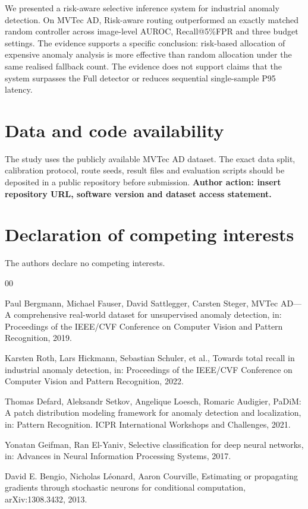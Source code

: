 \documentclass[preprint,12pt]{elsarticle}
\begin{document}
We presented a risk-aware selective inference system for industrial anomaly detection. On MVTec AD, Risk-aware routing outperformed an exactly matched random controller across image-level AUROC, Recall@5\%FPR and three budget settings. The evidence supports a specific conclusion: risk-based allocation of expensive anomaly analysis is more effective than random allocation under the same realised fallback count. The evidence does not support claims that the system surpasses the Full detector or reduces sequential single-sample P95 latency.

\section*{Data and code availability}

The study uses the publicly available MVTec AD dataset. The exact data split, calibration protocol, route seeds, result files and evaluation scripts should be deposited in a public repository before submission. \textbf{Author action: insert repository URL, software version and dataset access statement.}

\section*{Declaration of competing interests}

The authors declare no competing interests.

\begin{thebibliography}{00}

Paul Bergmann, Michael Fauser, David Sattlegger, Carsten Steger,
MVTec AD---A comprehensive real-world dataset for unsupervised anomaly detection,
in: Proceedings of the IEEE/CVF Conference on Computer Vision and Pattern Recognition, 2019.

Karsten Roth, Lars Hickmann, Sebastian Schuler, et al.,
Towards total recall in industrial anomaly detection,
in: Proceedings of the IEEE/CVF Conference on Computer Vision and Pattern Recognition, 2022.

Thomas Defard, Aleksandr Setkov, Angelique Loesch, Romaric Audigier,
PaDiM: A patch distribution modeling framework for anomaly detection and localization,
in: Pattern Recognition. ICPR International Workshops and Challenges, 2021.

Yonatan Geifman, Ran El-Yaniv,
Selective classification for deep neural networks,
in: Advances in Neural Information Processing Systems, 2017.

David E. Bengio, Nicholas Léonard, Aaron Courville,
Estimating or propagating gradients through stochastic neurons for conditional computation,
arXiv:1308.3432, 2013.

\end{thebibliography}
\end{document}
